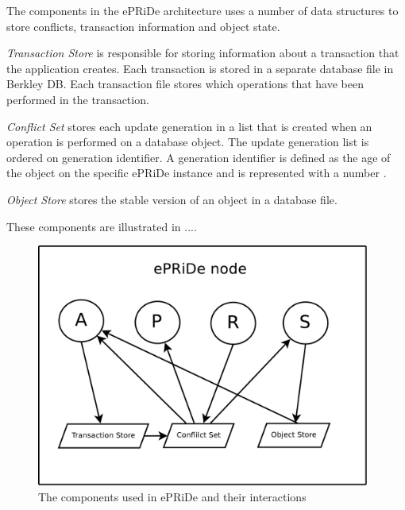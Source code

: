 The components in the ePRiDe architecture uses a number of data structures to store conflicts, transaction information and object state. 

\emph{Transaction Store} is responsible for storing information about a transaction that the application creates. Each transaction is stored in a separate database file in Berkley DB.  Each transaction file stores which operations that have been performed in the transaction.

\emph{Conflict Set} stores each update generation in a list that is created when an operation is performed on a database object. The update generation list is ordered on generation identifier. A generation identifier is defined as the age of the object on the specific ePRiDe instance and is represented with a number \cite[]{Syber2007}.    
 
\emph{Object Store} stores the stable version of an object in a database file.

These components are illustrated in ....

\begin{figure}[htb]
\centerline{\includegraphics[height=8cm]{components.pdf}}
\caption{The components used in ePRiDe and their interactions}\label{fig:components}
\end{figure}



%

